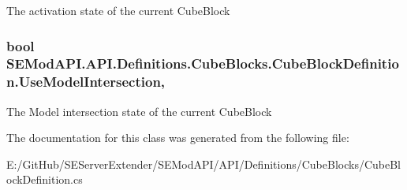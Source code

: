 The activation state of the current Cube\+Block 

\hypertarget{class_s_e_mod_a_p_i_1_1_a_p_i_1_1_definitions_1_1_cube_blocks_1_1_cube_block_definition_a2f13555e088bbfd5392ce6677f31e47e}{}
\subsubsection[{Use\+Model\+Intersection}]{\setlength{\rightskip}{0pt plus 5cm}bool S\+E\+Mod\+A\+P\+I.\+A\+P\+I.\+Definitions.\+Cube\+Blocks.\+Cube\+Block\+Definition.\+Use\+Model\+Intersection\hspace{0.3cm}{\ttfamily [get]}, {\ttfamily [set]}}\label{class_s_e_mod_a_p_i_1_1_a_p_i_1_1_definitions_1_1_cube_blocks_1_1_cube_block_definition_a2f13555e088bbfd5392ce6677f31e47e}


The Model intersection state of the current Cube\+Block 



The documentation for this class was generated from the following file\+:\begin{DoxyCompactItemize}
\item 
E\+:/\+Git\+Hub/\+S\+E\+Server\+Extender/\+S\+E\+Mod\+A\+P\+I/\+A\+P\+I/\+Definitions/\+Cube\+Blocks/Cube\+Block\+Definition.\+cs\end{DoxyCompactItemize}
